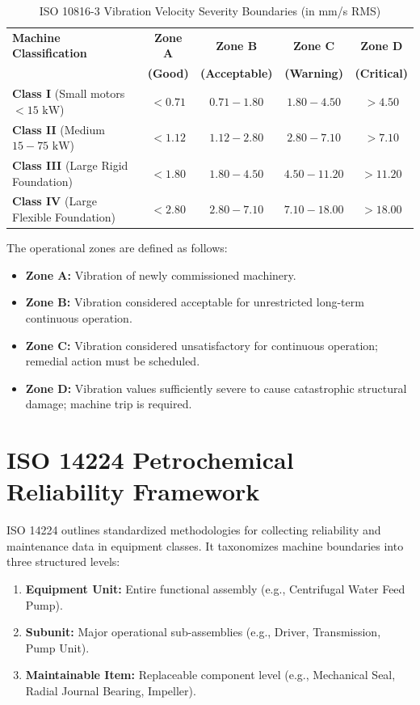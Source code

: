 \documentclass[12pt,a4paper,oneside]{report}
\begin{document}
\begin{table}[H]
\centering
\caption{ISO 10816-3 Vibration Velocity Severity Boundaries (in mm/s RMS)}
\label{tab:iso_limits}
\small
\begin{tabularx}{\textwidth}{Xcccc}
\toprule
\textbf{Machine Classification} & \textbf{Zone A} & \textbf{Zone B} & \textbf{Zone C} & \textbf{Zone D} \\
 & \textbf{(Good)} & \textbf{(Acceptable)} & \textbf{(Warning)} & \textbf{(Critical)} \\
\midrule
\textbf{Class I} (Small motors $<15\text{ kW}$) & $< 0.71$ & $0.71 - 1.80$ & $1.80 - 4.50$ & $> 4.50$ \\
\textbf{Class II} (Medium $15 - 75\text{ kW}$) & $< 1.12$ & $1.12 - 2.80$ & $2.80 - 7.10$ & $> 7.10$ \\
\textbf{Class III} (Large Rigid Foundation) & $< 1.80$ & $1.80 - 4.50$ & $4.50 - 11.20$ & $> 11.20$ \\
\textbf{Class IV} (Large Flexible Foundation) & $< 2.80$ & $2.80 - 7.10$ & $7.10 - 18.00$ & $> 18.00$ \\
\bottomrule
\end{tabularx}
\end{table}

The operational zones are defined as follows:
\begin{itemize}[leftmargin=*,noitemsep]
    \item \textbf{Zone A:} Vibration of newly commissioned machinery.
    \item \textbf{Zone B:} Vibration considered acceptable for unrestricted long-term continuous operation.
    \item \textbf{Zone C:} Vibration considered unsatisfactory for continuous operation; remedial action must be scheduled.
    \item \textbf{Zone D:} Vibration values sufficiently severe to cause catastrophic structural damage; machine trip is required.
\end{itemize}

\section{ISO 14224 Petrochemical Reliability Framework}
ISO 14224 outlines standardized methodologies for collecting reliability and maintenance data in equipment classes. It taxonomizes machine boundaries into three structured levels:
\begin{enumerate}[noitemsep]
    \item \textbf{Equipment Unit:} Entire functional assembly (e.g., Centrifugal Water Feed Pump).
    \item \textbf{Subunit:} Major operational sub-assemblies (e.g., Driver, Transmission, Pump Unit).
    \item \textbf{Maintainable Item:} Replaceable component level (e.g., Mechanical Seal, Radial Journal Bearing, Impeller).
\end{enumerate}
\end{document}
